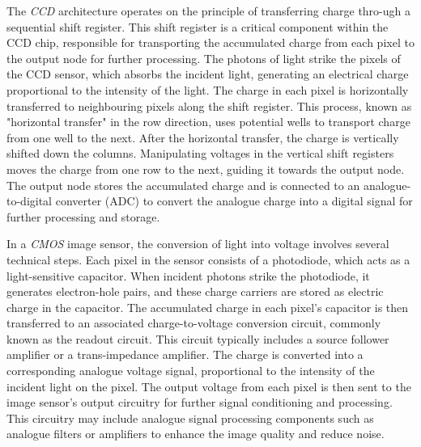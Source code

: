 The \textit{CCD} architecture operates on the principle of transferring charge thro-ugh a sequential shift register. This shift register is a critical component within the CCD chip, responsible for transporting the accumulated charge from each pixel to the output node for further processing. The photons of light strike the pixels of the CCD sensor, which absorbs the incident light, generating an electrical charge proportional to the intensity of the light. The charge in each pixel is horizontally transferred to neighbouring pixels along the shift register. This process, known as "horizontal transfer" in the row direction, uses potential wells to transport charge from one well to the next. After the horizontal transfer, the charge is vertically shifted down the columns. Manipulating voltages in the vertical shift registers moves the charge from one row to the next, guiding it towards the output node. The output node stores the accumulated charge and is connected to an analogue-to-digital converter (ADC) to convert the analogue charge into a digital signal for further processing and storage.

In a \textit{CMOS} image sensor, the conversion of light into voltage involves several technical steps. Each pixel in the sensor consists of a photodiode, which acts as a light-sensitive capacitor. When incident photons strike the photodiode, it generates electron-hole pairs, and these charge carriers are stored as electric charge in the capacitor. The accumulated charge in each pixel's capacitor is then transferred to an associated charge-to-voltage conversion circuit, commonly known as the readout circuit. This circuit typically includes a source follower amplifier or a trans-impedance amplifier. The charge is converted into a corresponding analogue voltage signal, proportional to the intensity of the incident light on the pixel. The output voltage from each pixel is then sent to the image sensor's output circuitry for further signal conditioning and processing. This circuitry may include analogue signal processing components such as analogue filters or amplifiers to enhance the image quality and reduce noise.

